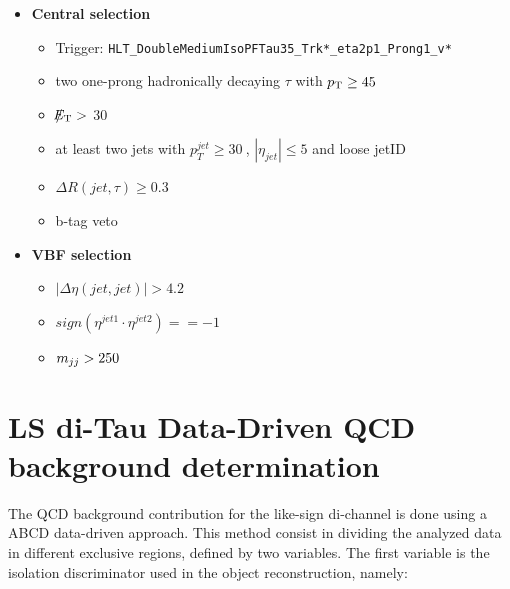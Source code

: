 
\begin{itemize}
	\item \textbf{Central selection}
	\begin{itemize}
		\item Trigger: \texttt{HLT\_DoubleMediumIsoPFTau35\_Trk*\_eta2p1\_Prong1\_v*}
		\item two one-prong hadronically decaying $\tau$ with $p_{\text{T}}\geq45~$\gev 
		\item $\slash\mkern-12mu{E}_{\text{T}} > $ 30
		\item at least two jets with $p_{T}^{jet}\geq30~$\gev, $|\eta_{jet}|\leq5$ and loose jetID
		\item $\Delta R(jet,\tau)\geq0.3$
		\item b-tag veto
	\end{itemize}
	\item \textbf{VBF selection}
	\begin{itemize}
		\item $|\Delta\eta(jet,jet)| > 4.2$
		\item $sign(\eta^{jet 1}\cdot\eta^{jet 2})==-1$
		\item $m_{jj}>250~$\gev
	\end{itemize}
\end{itemize}


\clearpage



\section {LS di-Tau Data-Driven QCD background determination} \label{sec:bgestimation}


The QCD background contribution for the like-sign di-\hadtau channel is done using a ABCD data-driven approach. This method consist in  dividing the analyzed data in different exclusive regions, defined by two variables. The first variable is the \hadtau isolation discriminator used in the object reconstruction, namely:
 	

